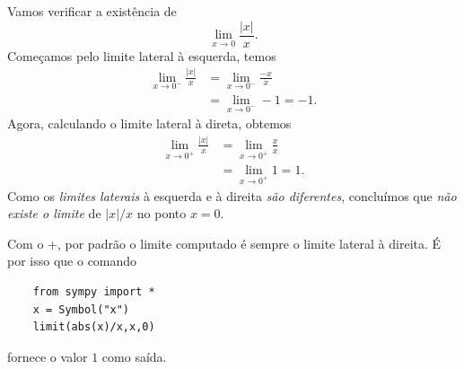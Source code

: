 \begin{exer}
  Vamos verificar a existência de
  \begin{equation}
    \lim_{x\to 0} \frac{|x|}{x}.
  \end{equation}
  Começamos pelo limite lateral à esquerda, temos
  \begin{align}
    \lim_{x\to 0^-} \frac{|x|}{x} &= \lim_{x\to 0^-} \frac{-x}{x}\\
    &= \lim_{x\to 0^-} -1 = -1.
  \end{align}
  Agora, calculando o limite lateral à direta, obtemos
  \begin{align}
    \lim_{x\to 0^+} \frac{|x|}{x} &= \lim_{x\to 0^+} \frac{x}{x}\\
    &= \lim_{x\to 0^+} 1 = 1.
  \end{align}
  Como os \emph{limites laterais} à esquerda e à direita \emph{são diferentes}, concluímos que \emph{não existe o limite} de $|x|/x$ no ponto $x=0$.

  \ifispython
  Com o {\python}+{\sympy}, por padrão o limite computado é sempre o limite lateral à direita. É por isso que o comando
  \begin{lstlisting}
    from sympy import *
    x = Symbol("x")
    limit(abs(x)/x,x,0)
  \end{lstlisting}
  fornece o valor $1$ como saída.
  \fi
\end{exer}


